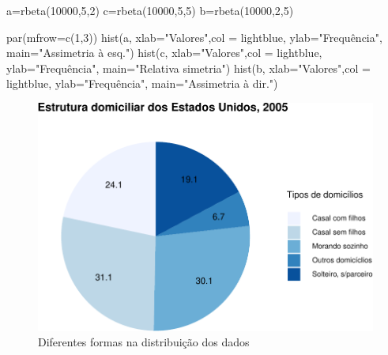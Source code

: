 \documentclass[
]{book}
\newenvironment{Shaded}{\begin{snugshade}}{\end{snugshade}}
\newcommand{\AttributeTok}[1]{\textcolor[rgb]{0.77,0.63,0.00}{#1}}
\newcommand{\DecValTok}[1]{\textcolor[rgb]{0.00,0.00,0.81}{#1}}
\newcommand{\FunctionTok}[1]{\textcolor[rgb]{0.00,0.00,0.00}{#1}}
\newcommand{\NormalTok}[1]{#1}
\newcommand{\OtherTok}[1]{\textcolor[rgb]{0.56,0.35,0.01}{#1}}
\newcommand{\StringTok}[1]{\textcolor[rgb]{0.31,0.60,0.02}{#1}}
\begin{document}
\begin{Shaded}
\begin{Highlighting}[]
\NormalTok{a}\OtherTok{=}\FunctionTok{rbeta}\NormalTok{(}\DecValTok{10000}\NormalTok{,}\DecValTok{5}\NormalTok{,}\DecValTok{2}\NormalTok{)}
\NormalTok{c}\OtherTok{=}\FunctionTok{rbeta}\NormalTok{(}\DecValTok{10000}\NormalTok{,}\DecValTok{5}\NormalTok{,}\DecValTok{5}\NormalTok{)}
\NormalTok{b}\OtherTok{=}\FunctionTok{rbeta}\NormalTok{(}\DecValTok{10000}\NormalTok{,}\DecValTok{2}\NormalTok{,}\DecValTok{5}\NormalTok{)}

\FunctionTok{par}\NormalTok{(}\AttributeTok{mfrow=}\FunctionTok{c}\NormalTok{(}\DecValTok{1}\NormalTok{,}\DecValTok{3}\NormalTok{))}
\FunctionTok{hist}\NormalTok{(a, }
     \AttributeTok{xlab=}\StringTok{"Valores"}\NormalTok{,}\AttributeTok{col =} \StringTok{\textquotesingle{}lightblue\textquotesingle{}}\NormalTok{,}
     \AttributeTok{ylab=}\StringTok{"Frequência"}\NormalTok{,}
     \AttributeTok{main=}\StringTok{"Assimetria à esq."}\NormalTok{)}
\FunctionTok{hist}\NormalTok{(c, }
     \AttributeTok{xlab=}\StringTok{"Valores"}\NormalTok{,}\AttributeTok{col =} \StringTok{\textquotesingle{}lightblue\textquotesingle{}}\NormalTok{,}
     \AttributeTok{ylab=}\StringTok{"Frequência"}\NormalTok{,}
     \AttributeTok{main=}\StringTok{"Relativa simetria"}\NormalTok{)}
\FunctionTok{hist}\NormalTok{(b, }
     \AttributeTok{xlab=}\StringTok{"Valores"}\NormalTok{,}\AttributeTok{col =} \StringTok{\textquotesingle{}lightblue\textquotesingle{}}\NormalTok{,}
     \AttributeTok{ylab=}\StringTok{"Frequência"}\NormalTok{,}
     \AttributeTok{main=}\StringTok{"Assimetria à dir."}\NormalTok{)}
\end{Highlighting}
\end{Shaded}

\begin{figure}

{\centering \includegraphics[width=0.8\linewidth]{apostila_files/figure-latex/unnamed-chunk-49-1} 

}

\caption{Diferentes formas na distribuição dos dados}\label{fig:unnamed-chunk-49}
\end{figure}
\end{document}
